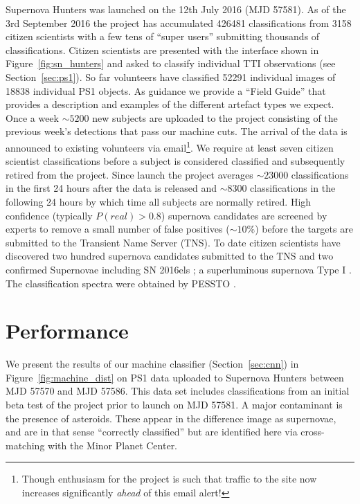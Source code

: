 \documentclass[a4paper,fleqn,usenatbib]{mnras}
\begin{document}
Supernova Hunters was launched on the 12th July 2016 (MJD 57581).  As of the 3rd September 2016 the project has accumulated 426481 classifications from 3158 citizen scientists with a few tens of ``super users'' submitting thousands of classifications.  Citizen scientists are presented with the interface shown in Figure~\ref{fig:sn_hunters} and asked to classify individual TTI observations (see Section~\ref{sec:ps1}).  So far volunteers have classified 52291 individual images of 18838 individual PS1 objects. As guidance we provide a ``Field Guide'' that provides a description and examples of the different artefact types we expect.  Once a week $\sim5200$ new subjects are uploaded to the project consisting of the previous week's detections that pass our machine cuts. The arrival of the data is announced to existing volunteers via email\footnote{Though enthusiasm for the project is such that traffic to the site now increases significantly \emph{ahead} of this email alert!}. We require at least seven citizen scientist classifications before a subject is considered classified and subsequently  retired from the project.  Since launch the project averages $\sim23000$ classifications in the first 24 hours after the data is released and $\sim8300$ classifications in the following 24 hours by which time all subjects are normally retired. High confidence (typically $P(real)>0.8$) supernova candidates are screened by experts to remove a small number of false positives ($\sim10\%$) before the targets are submitted to the Transient Name Server (TNS).  To date citizen scientists have discovered two hundred supernova candidates submitted to the TNS and two confirmed Supernovae including SN 2016els \citep{Mattila16}; a superluminous supernova Type I \citep{Gal-Yam12}.  The classification spectra were obtained by PESSTO \citep{Smartt15}.

\section{Performance}
\label{sec:perform}

We present the results of our machine classifier (Section~\ref{sec:cnn}) in Figure~\ref{fig:machine_dist} on PS1 data uploaded to Supernova Hunters between MJD 57570 and MJD 57586. This data set includes classifications from an initial beta test of the project prior to launch on MJD 57581.  A major contaminant is the presence of asteroids. These appear in the difference image as  supernovae, and are in that sense ``correctly classified'' but are identified here via cross-matching with the Minor Planet Center.
\end{document}
